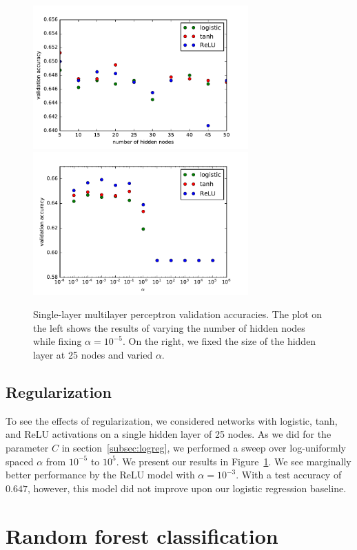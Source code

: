 \documentclass{article}
\begin{document}
\begin{multicols}{2}
\begin{figure}[t] %
   \centering
   \includegraphics[width=3.25in]{img/mlp-one-hidden-layer.pdf}
   \includegraphics[width=3.25in]{img/mlp-alpha-experiment.pdf}
   \caption{Single-layer multilayer perceptron validation accuracies.
   The plot on the left shows the results of varying the number of hidden nodes
   while fixing $\alpha = 10^{-5}$.
   On the right, we fixed the size of the hidden layer at 25 nodes
   and varied $\alpha$.}
   \label{fig:mlp-plots}
\end{figure}


\subsection{Regularization}

To see the effects of regularization,
we considered networks with logistic, tanh, and ReLU activations
on a single hidden layer of 25 nodes.
As we did for the parameter $C$ in section~\ref{subsec:logreg},
we performed a sweep over log-uniformly spaced $\alpha$ from $10^{-5}$ to $10^5$.
We present our results in Figure~\ref{fig:mlp-plots}.
We see marginally better performance by the ReLU model with $\alpha=10^{-3}$.
With a test accuracy of $0.647$, however,
this model did not improve upon our logistic regression baseline.


\section{Random forest classification}


\end{multicols}
\end{document}
